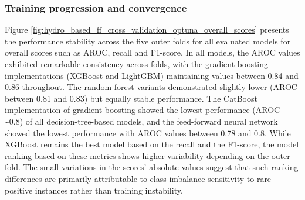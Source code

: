 \begin{figure}[htbp]
\label{fig:optuna_history}
\end{figure}

\subsubsection{Training progression and convergence}

Figure \ref{fig:hydro_based_ff_cross_validation_optuna_overall_scores} presents the performance stability across the five outer folds for all evaluated models for overall scores such as AROC, recall and F1-score. In all models, the AROC values exhibited remarkable consistency across folds, with the gradient boosting implementations (XGBoost and LightGBM) maintaining values between 0.84 and 0.86 throughout. The random forest variants demonstrated slightly lower (AROC between 0.81 and 0.83) but equally stable performance. The CatBoost implementation of gradient boosting showed the lowest performance (AROC \sim0.8) of all decision-tree-based models, and the feed-forward neural network showed the lowest performance with AROC values between 0.78 and 0.8. While XGBoost remains the best model based on the recall and the F1-score, the model ranking based on these metrics shows higher variability depending on the outer fold. The small variations in the scores' absolute values suggest that such ranking differences are primarily attributable to class imbalance sensitivity to rare positive instances rather than training instability. 

